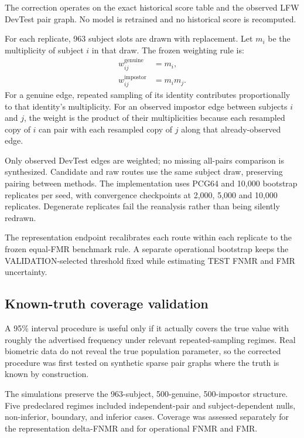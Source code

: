 \documentclass[10pt,a4paper]{article}
\begin{document}
The correction operates on the exact historical score table and the observed LFW DevTest
pair graph. No model is retrained and no historical score is recomputed.

For each replicate, 963 subject slots are drawn with replacement. Let $m_i$ be the
multiplicity of subject $i$ in that draw. The frozen weighting rule is:
\begin{align}
  w_{ij}^{\mathrm{genuine}} &= m_i,\\
  w_{ij}^{\mathrm{impostor}} &= m_i m_j.
\end{align}
For a genuine edge, repeated sampling of its identity contributes proportionally to that
identity's multiplicity. For an observed impostor edge between subjects $i$ and $j$, the
weight is the product of their multiplicities because each resampled copy of $i$ can pair
with each resampled copy of $j$ along that already-observed edge.

Only observed DevTest edges are weighted; no missing all-pairs comparison is synthesized.
Candidate and raw routes use the same subject draw, preserving pairing between methods. The
implementation uses PCG64 and 10,000 bootstrap replicates per seed, with convergence
checkpoints at 2,000, 5,000 and 10,000 replicates. Degenerate replicates fail the reanalysis
rather than being silently redrawn.

The representation endpoint recalibrates each route within each replicate to the frozen
equal-FMR benchmark rule. A separate operational bootstrap keeps the VALIDATION-selected
threshold fixed while estimating TEST FNMR and FMR uncertainty.

\subsection{Known-truth coverage validation}

A 95\% interval procedure is useful only if it actually covers the true value with roughly
the advertised frequency under relevant repeated-sampling regimes. Real biometric data do
not reveal the true population parameter, so the corrected procedure was first tested on
synthetic sparse pair graphs where the truth is known by construction.

The simulations preserve the 963-subject, 500-genuine, 500-impostor structure. Five
predeclared regimes included independent-pair and subject-dependent nulls, non-inferior,
boundary, and inferior cases. Coverage was assessed separately for the representation
delta-FNMR and for operational FNMR and FMR.
\end{document}
